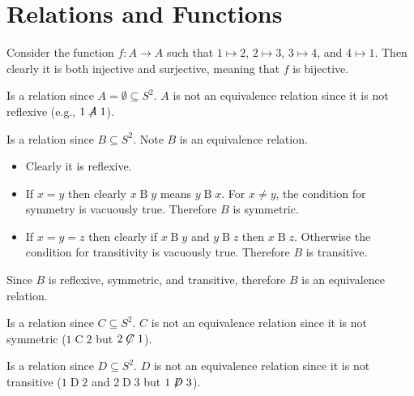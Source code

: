 \section{Relations and Functions}
\begin{questions}
    \item Consider the function $f: A \to A$ such that $1 \mapsto 2$, $2 \mapsto 3$, $3 \mapsto 4$, and $4 \mapsto 1$. Then clearly it is both injective and surjective, meaning that $f$ is bijective.
    
    \item \begin{partquestions}{\alph*}
        \item Is a relation since $A = \emptyset \subseteq S^2$. $A$ is not an equivalence relation since it is not reflexive (e.g., $1\not\mathrel{A}1$).
        
        \item Is a relation since $B \subseteq S^2$. Note $B$ is an equivalence relation.
        \begin{itemize}
            \item Clearly it is reflexive.
            \item If $x = y$ then clearly $x\mathrel{B}y$ means $y\mathrel{B}x$. For $x \neq y$, the condition for symmetry is vacuously true. Therefore $B$ is symmetric.
            \item If $x = y = z$ then clearly if $x\mathrel{B}y$ and $y\mathrel{B}z$ then $x\mathrel{B}z$. Otherwise the condition for transitivity is vacuously true. Therefore $B$ is transitive.
        \end{itemize}
        Since $B$ is reflexive, symmetric, and transitive, therefore $B$ is an equivalence relation.

        \item Is a relation since $C \subseteq S^2$. $C$ is not an equivalence relation since it is not symmetric ($1\mathrel{C}2$ but $2\not\mathrel{C}1$).
        
        \item Is a relation since $D \subseteq S^2$. $D$ is not an equivalence relation since it is not transitive ($1\mathrel{D}2$ and $2\mathrel{D}3$ but $1\not\mathrel{D}3$).
    \end{partquestions}
    

\end{questions}
